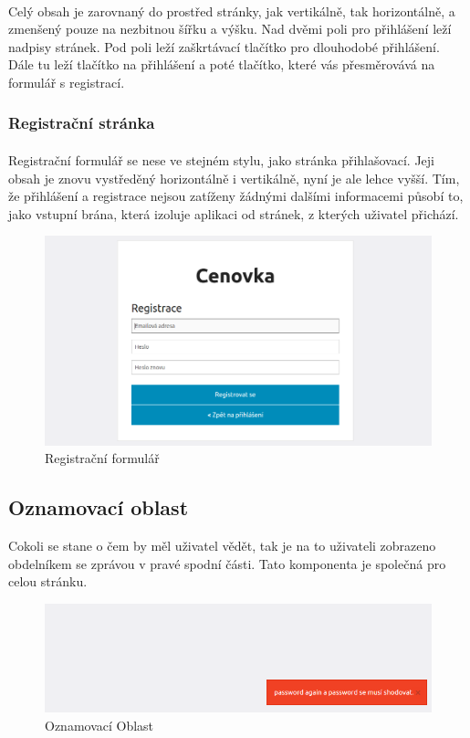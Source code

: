 \paragraph{} 
Celý obsah je zarovnaný do prostřed stránky, jak vertikálně, tak horizontálně, a zmenšený pouze na nezbitnou šířku a výšku. Nad dvěmi poli pro přihlášení leží nadpisy stránek. Pod poli leží zaškrtávací tlačítko pro dlouhodobé přihlášení. Dále tu leží tlačítko na přihlášení a poté tlačítko, které vás přesměrovává na formulář s registrací. 
\subsubsection{Registrační stránka}
\paragraph{}
Registrační formulář se nese ve stejném stylu, jako stránka přihlašovací. Jeji obsah je znovu vystředěný horizontálně i vertikálně, nyní je ale lehce vyšší. Tím, že přihlášení a registrace nejsou zatíženy žádnými dalšími informacemi působí to, jako vstupní brána, která izoluje aplikaci od stránek, z kterých uživatel přichází.
\begin{figure}[h]
\centering
\includegraphics[width=1\textwidth]{graphic/register.png}
\caption{Registrační formulář}
\end{figure}

\subsection{Oznamovací oblast}
Cokoli se stane o čem by měl uživatel vědět, tak je na to uživateli zobrazeno obdelníkem se zprávou v pravé spodní části. Tato komponenta je společná pro celou stránku. 
\begin{figure}[h]
\centering
\includegraphics[width=1\textwidth]{graphic/alert.png}
\caption{Oznamovací Oblast}
\end{figure}
